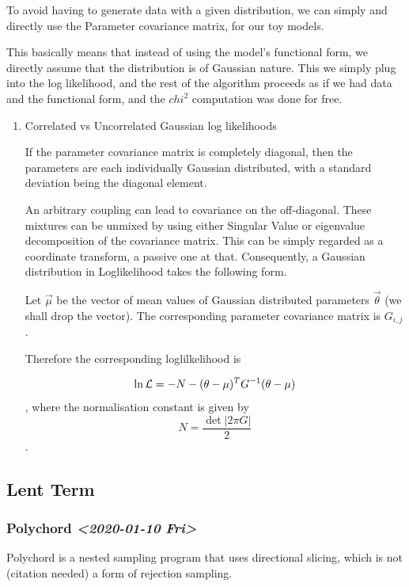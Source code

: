 \documentclass[11pt]{article}
\begin{document}
\begin{enumerate}
To avoid having to generate data with a given distribution,
we can simply and directly use the Parameter covariance
matrix, for our toy models.

This basically means that instead of using the model's
functional form, we directly assume that the distribution is
of Gaussian nature. This we simply plug into the log
likelihood, and the rest of the algorithm proceeds as if we
had data and the functional form, and the \(chi^2\)
computation was done for free.


\begin{enumerate}
\item Correlated vs Uncorrelated Gaussian log likelihoods
\label{sec:orgb8fdb4c}


If the parameter covariance matrix is completely diagonal,
then the parameters are each individually Gaussian
distributed, with a standard deviation being the diagonal
element.

An arbitrary coupling can lead to covariance on the
off-diagonal. These mixtures can be unmixed by using either
Singular Value or eigenvalue decomposition of the covariance
matrix. This can be simply regarded as a coordinate
transform, a passive one at that. Consequently, a Gaussian
distribution in Loglikelihood takes the following form.

Let \(\vec{\mu}\) be the vector of mean values of Gaussian
distributed parameters \(\vec{\theta}\) (we shall drop the
vector). The corresponding parameter covariance matrix is
\(G_{i,j}\).

Therefore the corresponding loglilkelihood is

\[ 
	  \ln {\cal L} = -N - (\theta - \mu)^{T} G^{-1} (\theta - \mu)
	  \],
where the normalisation constant is given by 
\[
	  N = \frac{\det \left| 2\pi G \right|}{2}
	  \].
\end{enumerate}
\end{enumerate}



\subsection{Lent Term}
\label{sec:org27e618e}

\subsubsection{Polychord \textit{<2020-01-10 Fri>}}
\label{sec:orge375ab0}

Polychord is a nested sampling program that uses directional
slicing, which is not (citation needed) a form of rejection
sampling.
\end{document}
